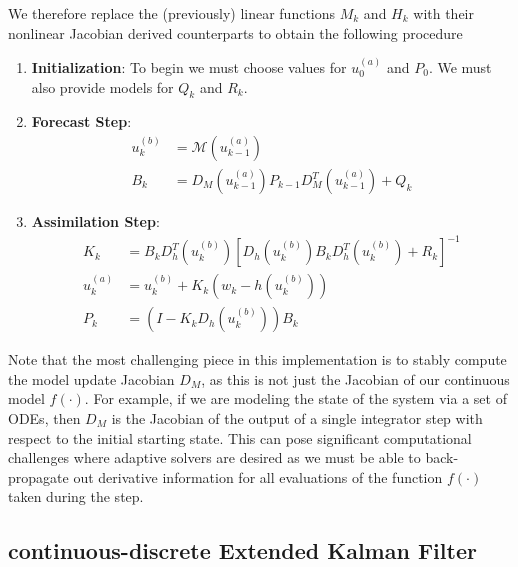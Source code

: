 We therefore replace the (previously) linear functions $M_k$ and $H_k$ with their nonlinear Jacobian derived counterparts to obtain the following procedure
\begin{enumerate}
\item \textbf{Initialization}: To begin we must choose values for $u_0^{(a)}$ and $P_0$. We must also provide models for $Q_k$ and $R_k$.
\item \textbf{Forecast Step}:
\begin{align}
    u_k^{(b)} &= \mathcal{M}(u_{k-1}^{(a)}) \\
    B_k &= D_M(u_{k-1}^{(a)})P_{k-1}D_M^T(u_{k-1}^{(a)}) + Q_k
\end{align}
\item \textbf{Assimilation Step}:
\begin{align}
    K_k &= B_kD_h^T(u_k^{(b)})\left[ D_h(u_k^{(b)})B_kD_h^T(u_k^{(b)}) + R_k \right]^{-1}\\
    u_k^{(a)} &= u_k^{(b)} + K_k(w_k - h(u_k^{(b)})) \\
    P_k &= \left( I - K_kD_h(u_k^{(b)}) \right)B_k
\end{align}
\end{enumerate}
Note that the most challenging piece in this implementation is to stably compute the model update Jacobian $D_M$, as this is not just the Jacobian of our continuous model $f(\cdot)$. For example, if we are modeling the state of the system via a set of ODEs, then $D_M$ is the Jacobian of the output of a single integrator step with respect to the initial starting state. This can pose significant computational challenges where adaptive solvers are desired as we must be able to back-propagate out derivative information for all evaluations of the function $f(\cdot)$ taken during the step.


\subsection{continuous-discrete Extended Kalman Filter}


